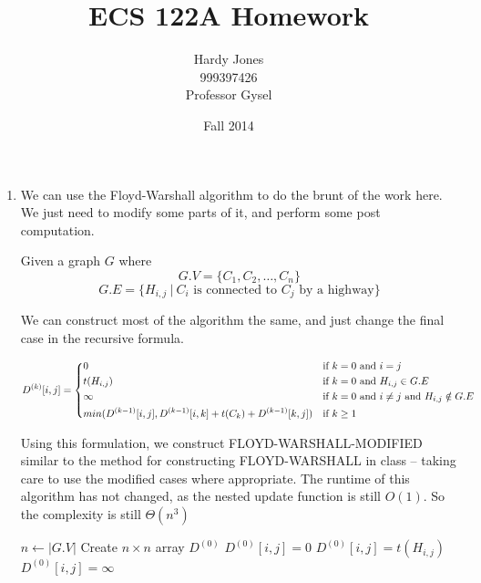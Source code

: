 \documentclass[12pt,letterpaper]{article}
\title{ECS 122A Homework \vspace{-2ex}}
\author{Hardy Jones\\
        999397426\\
        Professor Gysel\vspace{-2ex}}
\date{Fall 2014}
\begin{document}
  \maketitle

  \begin{enumerate}
    \item
      We can use the Floyd-Warshall algorithm to do the brunt of the work here.
      We just need to modify some parts of it, and perform some post computation.

      Given a graph $G$ where
      \[
        G.V = \{C_1, C_2, \dots, C_n\}
      \]
      \[
        G.E = \{H_{i, j} \ | \ C_i \text{ is connected to } C_j \text{ by a highway}\}
      \]

      We can construct most of the algorithm the same,
      and just change the final case in the recursive formula.


      \[
        D^{(k)}[i, j] =
        \begin{dcases*}
          0           & if $k = 0$ and $i = j$ \\
          t(H_{i, j}) & if $k = 0$ and $H_{i, j} \in G.E$ \\
          \infty      & if $k = 0$ and $i \ne j$ and $H_{i, j} \notin G.E$ \\
          min(D^{(k-1)}[i, j], D^{(k-1)}[i, k] + t(C_k) + D^{(k-1)}[k, j]) & if $k \ge 1$
        \end{dcases*}
      \]

      Using this formulation, we construct FLOYD-WARSHALL-MODIFIED similar to the method for constructing FLOYD-WARSHALL in class -- taking care to use the modified cases where appropriate.
      The runtime of this algorithm has not changed, as the nested update function is still $O(1)$.
      So the complexity is still $\Theta(n^3)$

      \pagebreak

      \begin{algorithm}
        \begin{algorithmic}
            \State $n \gets |G.V|$
            \State Create $n \times n$ array $D^{(0)}$
                  \State $D^{(0)}[i, j] = 0$
                  \State $D^{(0)}[i, j] = t(H_{i, j})$
                \Else
                  \State $D^{(0)}[i, j] = \infty$
                \EndIf
              \EndFor
            \EndFor


\end{algorithmic}
\end{algorithm}
\end{enumerate}
\end{document}
